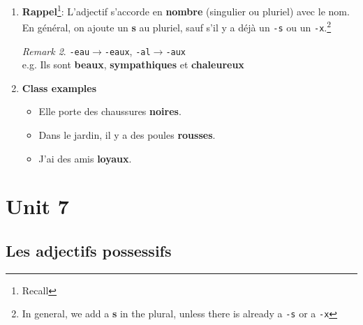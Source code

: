 \documentclass[math,code]{amznotes}
\theoremstyle{remark}
\newtheorem*{remark}{Remark}
\begin{document}
\begin{enumerate}
\begin{table}[h]
\begin{tabular}{|l|l|l|}
    \end{tabular}
    \caption{L'accord des adjectifs}
    \label{tab:laccord-des-adjectifs}
    \end{table}
    \begin{notebox}
        \begin{remark}
             $\rightarrow$ ,  $\rightarrow$ ,  $\rightarrow$ ,  $\rightarrow$ ,  $\rightarrow$ ,  $\rightarrow$ ,  $\rightarrow$ ,  $\rightarrow$ .
        \end{remark}
    \end{notebox}
    \item \textbf{Rappel}\footnote{Recall}: L'adjectif s'accorde en \textbf{nombre} (singulier ou pluriel) avec le nom. \\
    En général, on ajoute un \textbf{s} au pluriel, sauf s'il y a déjà un \texttt{-s} ou un \texttt{-x}.\footnote{In general, we add a \textbf{s} in the plural, unless there is already a \texttt{-s} or a \texttt{-x}}
    \begin{notebox}
        \begin{remark}
            \texttt{-eau}$\rightarrow$\texttt{-eaux}, \texttt{-al}$\rightarrow$\texttt{-aux} \\
            e.g. Ils sont \textbf{beaux}, \textbf{sympathiques} et \textbf{chaleureux}
        \end{remark}
    \end{notebox}
    \item \textbf{Class examples}
    \begin{itemize}
        \item Elle porte des chaussures \textbf{noires}.
        \item Dans le jardin, il y a des poules \textbf{rousses}.
        \item J'ai des amis \textbf{loyaux}.
    \end{itemize}
\end{enumerate}

\chapter{Unit 7}
\section{Les adjectifs possessifs}
\end{document}
